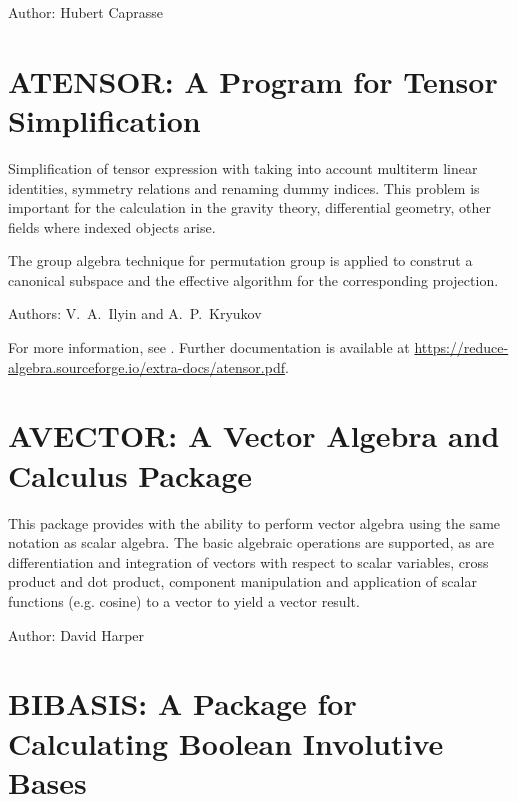 Author: Hubert Caprasse



\newpage

\section{ATENSOR: A \REDUCE Program for Tensor Simplification}

Simplification of tensor expression with taking into account multiterm linear
identities, symmetry relations and renaming dummy indices. This problem is important
for the calculation in the gravity theory, differential geometry,
other fields where indexed objects arise.

The group algebra technique for permutation group is applied to construt a canonical
subspace and the effective algorithm for the corresponding projection.

Authors: V.~A.~Ilyin and A.~P.~Kryukov

\begin{sloppypar}
  For more information, see \cite{Ilyin:96}.  Further documentation is
  available at
  \url{https://reduce-algebra.sourceforge.io/extra-docs/atensor.pdf}.
\end{sloppypar}

%

\newpage

\section{AVECTOR: A Vector Algebra and Calculus Package}

This package provides \REDUCE with the ability to perform vector algebra
using the same notation as scalar algebra.  The basic algebraic operations
are supported, as are differentiation and integration of vectors with
respect to scalar variables, cross product and dot product, component
manipulation and application of scalar functions (e.g. cosine) to a vector
to yield a vector result.

Author: David Harper



\newpage

\section{BIBASIS: A Package for Calculating Boolean Involutive Bases}
 \label{BIBASIS}

